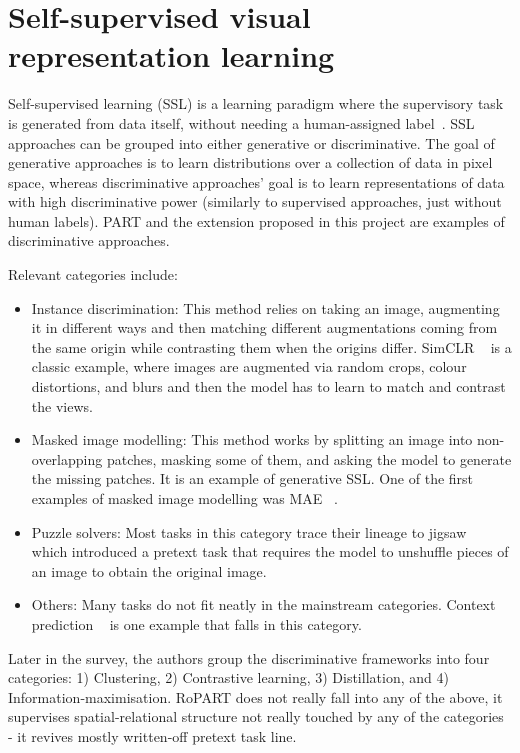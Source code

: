 \documentclass[final_report.tex]{subfiles}
\begin{document}
\label{ch:background}

\section{Self-supervised visual representation learning}\label{sec:ssl}
Self-supervised learning (SSL) is a learning paradigm where the supervisory task is generated from data itself, without needing a human-assigned label~\cite{sslsurvey}. SSL approaches can be grouped into either generative or discriminative. The goal of generative approaches is to learn distributions over a collection of data in pixel space, whereas discriminative approaches' goal is to learn representations of data with high discriminative power (similarly to supervised approaches, just without human labels). PART and the extension proposed in this project are examples of discriminative approaches. 

Relevant categories include:
\begin{itemize}
\item Instance discrimination: This method relies on taking an image, augmenting it in different ways and then matching different augmentations coming from the same origin while contrasting them when the origins differ. SimCLR ~\cite{simclr} is a classic example, where images are augmented via random crops, colour distortions, and blurs and then the model has to learn to match and contrast the views.
\item Masked image modelling: This method works by splitting an image into non-overlapping patches, masking some of them, and asking the model to generate the missing patches. It is an example of generative SSL. One of the first examples of masked image modelling was MAE ~\cite{mae}.
\item Puzzle solvers: Most tasks in this category trace their lineage to jigsaw ~\cite{jigsaw} which introduced a pretext task that requires the model to unshuffle pieces of an image to obtain the original image.
\item Others: Many tasks do not fit neatly in the mainstream categories. Context prediction ~\cite{context2015} is one example that falls in this category.
\end{itemize}

Later in the survey, the authors group the discriminative frameworks into four categories: 1) Clustering, 2) Contrastive learning, 3) Distillation, and 4) Information-maximisation. RoPART does not really fall into any of the above, it supervises spatial-relational structure not really touched by any of the categories - it revives mostly written-off pretext task line.
\end{document}
